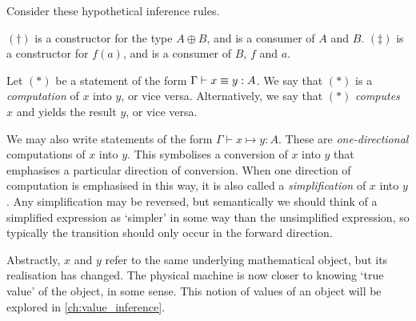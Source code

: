 \documentclass[11pt]{book}
\begin{document}
\begin{egs}
  Consider these hypothetical inference rules.
  \((\dagger)\) is a constructor for the type \( A \oplus B \), and is a consumer of \( A \) and \( B \).
  \((\ddagger)\) is a constructor for \( f(a) \), and is a consumer of \( B \), \( f \) and \( a \).
\end{egs}
\begin{defn}
  Let \((\ast)\) be a statement of the form \( \Gamma \vdash x \equiv y : A \).
  We say that \((\ast)\) is a \textit{computation} of \( x \) into \( y \), or vice versa.
  Alternatively, we say that \((\ast)\) \textit{computes} \( x \) and yields the result \( y \), or vice versa.

  We may also write statements of the form \( \Gamma \vdash x \mapsto y : A \).
  These are \textit{one-directional} computations of \( x \) into \( y \).
  This symbolises a conversion of \( x \) into \( y \) that emphasises a particular direction of conversion.
  When one direction of computation is emphasised in this way, it is also called a \textit{simplification} of \( x \) into \( y \).
  Any simplification may be reversed, but semantically we should think of a simplified expression as `simpler' in some way than the unsimplified expression, so typically the transition should only occur in the forward direction.

  Abstractly, \( x \) and \( y \) refer to the same underlying mathematical object, but its realisation has changed.
  The physical machine is now closer to knowing `true value' of the object, in some sense.
  This notion of values of an object will be explored in \cref{ch:value_inference}.
\end{defn}
\end{document}

